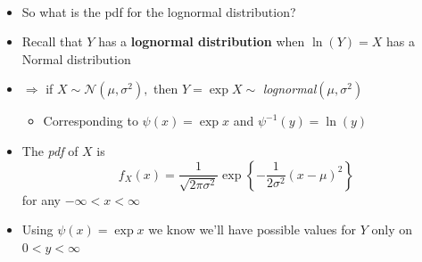 \documentclass[smaller]{beamer}\usepackage[]{graphicx}\usepackage[]{color}
\newcommand{\N}{\mathcal{N}}
\newenvironment{stepitemize}{\begin{itemize}[<+->]}{\end{itemize} }
\begin{document}
\begin{frame}{\secname}
  \framesubtitle{\subsecname}

  \begin{example}
  \begin{footnotesize}
  \begin{stepitemize}
  \item So what is the pdf for the lognormal distribution?

  \item Recall that $Y$ has a \textbf{lognormal distribution} when $\ln \left(
  Y\right) =X$ has a Normal distribution

  \item $\Rightarrow $ if $X\sim \N\left( \mu ,\sigma ^{2}\right) ,$ then $%
  Y=\exp X \sim $ \emph{lognormal}$\left( \mu ,\sigma ^{2}\right) $

  \begin{stepitemize}
  \item Corresponding to $\psi \left( x\right) =\exp x$ and $\psi
  ^{-1}\left( y\right) =\ln (y)$
  \end{stepitemize}

  \item The \emph{pdf} of $X$ is
  \begin{equation*}
  f_{X}\left( x\right) =\frac{1}{\sqrt{2\pi \sigma ^{2}}}\exp{ \left\{ -\frac{1%
  }{2\sigma ^{2}}\left( x-\mu \right) ^{2}\right\}}
  \end{equation*}%
  for any $-\infty <x<\infty $

  \item Using $\psi \left( x\right) =\exp x$ we know we'll have possible
  values for $Y$ only on $0<y<\infty $
  \end{stepitemize}
  \end{footnotesize}
  \end{example}
\end{frame}
\end{document}
